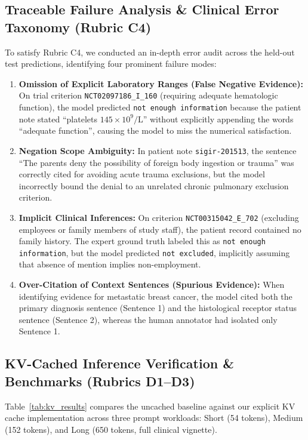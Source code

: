 \documentclass[conference]{IEEEtran}
\begin{document}
\subsection{Traceable Failure Analysis \& Clinical Error Taxonomy (Rubric C4)}
To satisfy Rubric C4, we conducted an in-depth error audit across the held-out test predictions, identifying four prominent failure modes:
\begin{enumerate}
    \item \textbf{Omission of Explicit Laboratory Ranges (False Negative Evidence):} On trial criterion \texttt{NCT02097186\_I\_160} (requiring adequate hematologic function), the model predicted \texttt{not enough information} because the patient note stated ``platelets $145 \times 10^9/\text{L}$'' without explicitly appending the words ``adequate function'', causing the model to miss the numerical satisfaction.
    \item \textbf{Negation Scope Ambiguity:} In patient note \texttt{sigir-201513}, the sentence ``The parents deny the possibility of foreign body ingestion or trauma'' was correctly cited for avoiding acute trauma exclusions, but the model incorrectly bound the denial to an unrelated chronic pulmonary exclusion criterion.
    \item \textbf{Implicit Clinical Inferences:} On criterion \texttt{NCT00315042\_E\_702} (excluding employees or family members of study staff), the patient record contained no family history. The expert ground truth labeled this as \texttt{not enough information}, but the model predicted \texttt{not excluded}, implicitly assuming that absence of mention implies non-employment.
    \item \textbf{Over-Citation of Context Sentences (Spurious Evidence):} When identifying evidence for metastatic breast cancer, the model cited both the primary diagnosis sentence (Sentence 1) and the histological receptor status sentence (Sentence 2), whereas the human annotator had isolated only Sentence 1.
\end{enumerate}

\subsection{KV-Cached Inference Verification \& Benchmarks (Rubrics D1--D3)}
Table~\ref{tab:kv_results} compares the uncached baseline against our explicit KV cache implementation across three prompt workloads: Short (54 tokens), Medium (152 tokens), and Long (650 tokens, full clinical vignette).
\end{document}
